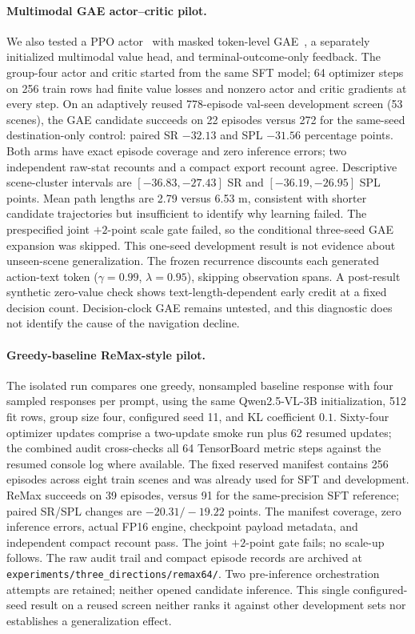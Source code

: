 \documentclass[10pt,twocolumn,letterpaper]{article}
\begin{document}
\paragraph{Multimodal GAE actor--critic pilot.} We also tested
a PPO actor~\cite{schulman2017ppo} with masked token-level
GAE~\cite{schulman2016gae}, a separately initialized multimodal value
head, and terminal-outcome-only feedback. The group-four actor and critic
started from the same SFT model; 64 optimizer steps on 256 train rows
had finite value losses and nonzero actor and critic gradients at every
step. On an adaptively reused 778-episode val-seen development screen
(53 scenes), the GAE candidate succeeds on 22 episodes versus 272 for
the same-seed destination-only control: paired SR $-32.13$ and SPL
$-31.56$ percentage points. Both arms have exact episode coverage and
zero inference errors; two independent raw-stat recounts and a compact
export recount agree. Descriptive scene-cluster intervals are
$[-36.83,-27.43]$ SR and $[-36.19,-26.95]$ SPL points. Mean path
lengths are 2.79 versus 6.53 m, consistent with shorter candidate
trajectories but insufficient to identify why learning failed. The
prespecified joint $+2$-point scale gate failed, so the conditional
three-seed GAE expansion was skipped. This one-seed development result
is not evidence about unseen-scene generalization.
The frozen recurrence discounts each generated action-text token
($\gamma=0.99$, $\lambda=0.95$), skipping observation spans. A post-result
synthetic zero-value check shows text-length-dependent early credit at a
fixed decision count. Decision-clock GAE remains untested, and this
diagnostic does not identify the cause of the navigation decline.

\paragraph{Greedy-baseline ReMax-style pilot.} The isolated run compares
one greedy, nonsampled baseline response with four sampled responses per
prompt, using the same Qwen2.5-VL-3B initialization, 512 fit rows, group
size four, configured seed 11, and KL coefficient $0.1$. Sixty-four
optimizer updates comprise a two-update smoke run plus 62 resumed updates;
the combined audit cross-checks all 64 TensorBoard metric steps against the
resumed console log where available. The fixed reserved manifest contains
256 episodes across eight train scenes and was already used for SFT and
development. ReMax succeeds on 39 episodes, versus 91 for the same-precision
SFT reference; paired SR/SPL changes are $-20.31/-19.22$ points. The
manifest coverage, zero inference errors, actual FP16 engine, checkpoint
payload metadata, and independent compact recount pass. The joint
$+2$-point gate fails; no scale-up follows. The raw audit trail and compact
episode records are archived at
\texttt{experiments/three\_directions/remax64/}. Two pre-inference
orchestration attempts are retained; neither opened candidate inference.
This single configured-seed result on a reused screen neither ranks it
against other development sets nor establishes a generalization effect.
\end{document}
